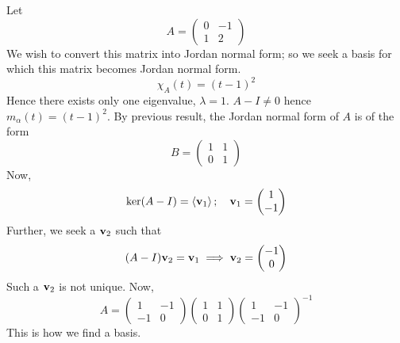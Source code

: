 \documentclass[a4paper]{article}
\begin{document}
\begin{example}
	Let
	\[
		A = \begin{pmatrix}
			0 & -1 \\
			1 & 2
		\end{pmatrix}
	\]
	We wish to convert this matrix into Jordan normal form; so we seek a basis for which this matrix becomes Jordan normal form.
	\[
		\chi_A(t) = (t-1)^2
	\]
	Hence there exists only one eigenvalue, \( \lambda = 1 \).
	\( A - I \neq 0 \) hence \( m_\alpha(t) = (t-1)^2 \).
	By previous result, the Jordan normal form of \( A \) is of the form
	\[
		B = \begin{pmatrix}
			1 & 1 \\
			0 & 1
		\end{pmatrix}
	\]
	Now,
	\[
		\ker(A - I) = \left\langle{} {\bf v}_1 \right\rangle;\quad {\bf v}_1 = \begin{pmatrix}
			1 \\ -1
		\end{pmatrix}
	\]
	Further, we seek a \( {\bf v}_2 \) such that
	\[
		(A - I){\bf v}_2 = {\bf v}_1 \implies {\bf v}_2 = \begin{pmatrix}
			-1 \\ 0
		\end{pmatrix}
	\]
	Such a \( {\bf v}_2 \) is not unique.
	Now,
	\[
		A = \begin{pmatrix}
			1  & -1 \\
			-1 & 0
		\end{pmatrix}
		\begin{pmatrix}
			1 & 1 \\
			0 & 1
		\end{pmatrix}
		\begin{pmatrix}
			1  & -1 \\
			-1 & 0
		\end{pmatrix}^{-1}
	\]
	This is how we find a basis. 
\end{example}
\end{document}

